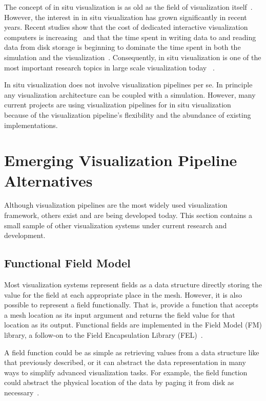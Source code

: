 \documentclass[journal,onecolumn,12pt,letterpaper,twoside]{IEEEtran}
\newcommand*{\lcite}[1]{~\cite{#1}}
\begin{document}
The concept of in situ visualization is as old as the field of
visualization itself\lcite{ViSC1987}.  However, the interest in in situ
visualization has grown significantly in recent years.  Recent studies show
that the cost of dedicated interactive visualization computers is
increasing\lcite{Childs2007} and that the time spent in writing data to and
reading data from disk storage is beginning to dominate the time spent in
both the simulation and the
visualization\lcite{Ross2008,Peterka2008,Peterka2009}.  Consequently, in
situ visualization is one of the most important research topics in large
scale visualization today%
\lcite{VisualizationKnowledgeDiscovery2007,ScientificDiscoveryExascale2011}.

In situ visualization does not involve visualization pipelines per se.  In
principle any visualization architecture can be coupled with a simulation.
However, many current projects are using visualization pipelines for in
situ visualization%
\lcite{Biddiscombe2011,Fabian2011,Johnson1999,Klasky2011,Moreland2011:PDAC,VisItLibsim}
because of the visualization pipeline's flexibility and the abundance of
existing implementations.


\section{Emerging Visualization Pipeline Alternatives}
\label{sec:Alternatives}

Although visualization pipelines are the most widely used visualization
framework, others exist and are being developed today.  This section
contains a small sample of other visualization systems under current
research and development.

\subsection{Functional Field Model}
\label{sec:FunctionalFieldModel}

Most visualization systems represent fields as a data structure directly
storing the value for the field at each appropriate place in the mesh.
However, it is also possible to represent a field functionally.  That is,
provide a function that accepts a mesh location as its input argument and
returns the field value for that location as its output.  Functional fields
are implemented in the Field Model (FM) library, a follow-on to the Field
Encapsulation Library (FEL)\lcite{FELPaper}.

A field function could be as simple as retrieving values from a data
structure like that previously described, or it can abstract the data
representation in many ways to simplify advanced visualization tasks.  For
example, the field function could abstract the physical location of the
data by paging it from disk as necessary\lcite{Cox1997}.
\end{document}
